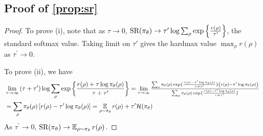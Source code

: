 \subsection{Proof of \cref{prop:sr}}
\begin{proof}
	To prove (i), note that as $\tau \to 0$, $\text{SR}(\pi_\theta) \to \tau^{\prime} \log{ \sum_{\rho}{ \exp\left\{ \frac{r(\rho) }{ \tau^{\prime} } \right\} }}$, the standard softmax value. Taking limit on $\tau'$ gives the hardmax value $\max_{\rho}{r(\rho)}$ as $\tau^{\prime} \to 0$.
	
	To prove (ii), we have 
	\begin{align*}
	&\lim\limits_{\tau \to \infty}{ (\tau + \tau^{\prime})\log{ \sum_{\rho}{ \exp\left\{ \frac{r(\rho) + \tau \log{\pi_\theta(\rho)} }{\tau + \tau^{\prime}} \right\} }} } = {\scalebox{.95} {$\lim\limits_{\tau \to \infty}{ \frac{ \sum_{\rho}{ \pi_\theta(\rho) \exp\{ \frac{r(\rho) - \tau^{\prime} \log{\pi_\theta(\rho)} }{\tau + \tau^{\prime}} \} \left( r(\rho) - \tau^{\prime}\log{\pi_\theta(\rho)} \right) } }{  \sum_{\rho}{ \pi_\theta(\rho) \exp\{ \frac{r(\rho) - \tau^{\prime} \log{\pi_\theta(\rho)} }{\tau + \tau^{\prime}} \} } } }$ } }\\
	&= \sum_{\rho}{ \pi_\theta(\rho) \left[ r(\rho) - \tau^{\prime}\log{\pi_\theta(\rho)} \right] } = \ep_{\rho \sim \pi_\theta}{r(\rho)} + \tau^{\prime} \mathcal{H}(\pi_\theta)
	\end{align*}
	As $\tau^{\prime} \to 0$, $\text{SR}(\pi_\theta) \to \operatorname*{\mathbb{E}}_{\rho \sim \pi_\theta}{r(\rho)}$.
\end{proof}

